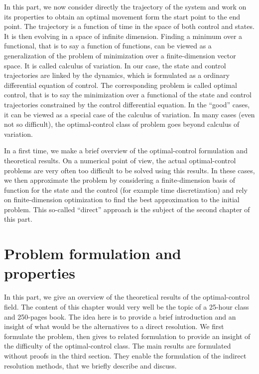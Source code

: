 \documentclass{book}
\begin{document}
In this part, we now consider directly the trajectory of the system and work on its properties to obtain an optimal movement form the start point to the end point. The trajectory is a function of time in the space of both control and states. It is then evolving in a space of infinite dimension. Finding a minimum over a functional, that is to say a function of functions, can be viewed as a generalization of the problem of minimization over a finite-dimension vector space. It is called calculus of variation. In our case, the state and control trajectories are linked by the dynamics, which is formulated as a ordinary differential equation of control. The corresponding problem is called optimal control, that is to say the minimization over a functional of the state and control trajectories constrained by the control differential equation. In the ``good'' cases, it can be viewed as a special case of the calculus of variation. In many cases (even not so difficult), the optimal-control class of problem goes beyond calculus of variation.

In a first time, we make a brief overview of the optimal-control formulation and theoretical results. On a numerical point of view, the actual optimal-control problems are very often too difficult to be solved using this results. In these cases, we then approximate the problem by considering a finite-dimension basis of function for the state and the control (for example time discretization) and rely on finite-dimension optimization to find the best approximation to the initial problem. This so-called ``direct'' approach is the subject of the second chapter of this part.


\chapter{Problem formulation and properties}

In this part, we give an overview of the theoretical results of the optimal-control field. The content of this chapter would very well be the topic of a 25-hour class and 250-pages book. The idea here is to provide a brief introduction and an insight of what would be the alternatives to a direct resolution. We first formulate the problem, then gives to related formulation to provide an insight of the difficulty of the optimal-control class. The main results are formulated without proofs in the third section. They enable the formulation of the indirect resolution methods, that we briefly describe and discuss.
\end{document}
